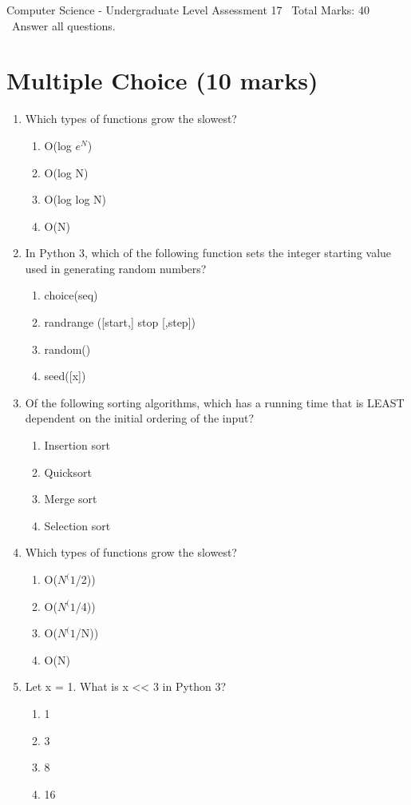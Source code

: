 \documentclass[12pt]{article}
\begin{document}
\begin{center}
Computer Science - Undergraduate Level Assessment 17 \
Total Marks: 40 \
Answer all questions.
\end{center}

\section*{Multiple Choice (10 marks)}
\begin{enumerate}[label=\arabic*.]
\item Which types of functions grow the slowest?
\begin{enumerate}[label=(\alph*)]
    \item O(log $e^N$)
    \item O(log N)
    \item O(log log N)
    \item O(N)
\end{enumerate}
\item In Python 3, which of the following function sets the integer starting value used in generating random numbers?
\begin{enumerate}[label=(\alph*)]
    \item choice(seq)
    \item randrange ([start,] stop [,step])
    \item random()
    \item seed([x])
\end{enumerate}
\item Of the following sorting algorithms, which has a running time that is LEAST dependent on the initial ordering of the input?
\begin{enumerate}[label=(\alph*)]
    \item Insertion sort
    \item Quicksort
    \item Merge sort
    \item Selection sort
\end{enumerate}
\item Which types of functions grow the slowest?
\begin{enumerate}[label=(\alph*)]
    \item O($N^(1$/2))
    \item O($N^(1$/4))
    \item O($N^(1$/N))
    \item O(N)
\end{enumerate}
\item Let x = 1. What is x \textless{}\textless{} 3 in Python 3?
\begin{enumerate}[label=(\alph*)]
    \item 1
    \item 3
    \item 8
    \item 16
\end{enumerate}
\end{enumerate}
\end{document}
